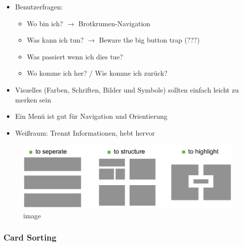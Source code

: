 \begin{itemize}
\item
  Benutzerfragen:

  \begin{itemize}
  \item
    Wo bin ich? $\rightarrow$ Brotkrumen-Navigation
  \item
    Was kann ich tun? $\rightarrow$ Beware the big button trap (???)
  \item
    Was passiert wenn ich dies tue?
  \item
    Wo komme ich her? / Wie komme ich zurück?
  \end{itemize}
\item
  Visuelles (Farben, Schriften, Bilder und Symbole) sollten einfach
  leicht zu merken sein
\item
  Ein Menü ist gut für Navigation und Orientierung
\item
  Weißraum: Trennt Informationen, hebt hervor
\end{itemize}

\begin{figure}[htbp]
\centering
\includegraphics{inc/whitespace.pdf}
\caption{image}
\end{figure}

\subsubsection{Card Sorting}

